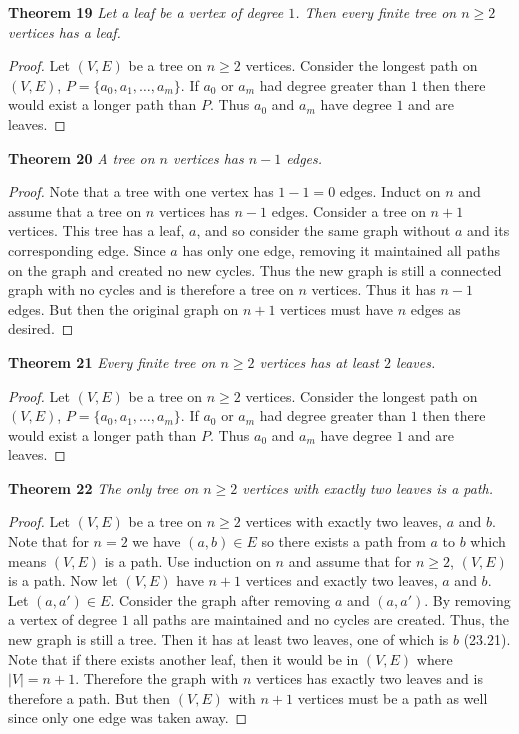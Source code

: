 \documentclass{article}
\begin{document}
\begin{flushleft}
\textbf{Theorem 19}
\textsl{Let a leaf be a vertex of degree $1$. Then every finite tree on $n \geq 2$ vertices has a leaf.}
\begin{proof}
Let $(V,E)$ be a tree on $n \geq 2$ vertices. Consider the longest path on $(V,E)$, $P = \{a_0, a_1, \dots , a_m\}$. If $a_0$ or $a_m$ had degree greater than $1$ then there would exist a longer path than $P$. Thus $a_0$ and $a_m$ have degree $1$ and are leaves.
\end{proof}

\textbf{Theorem 20}
\textsl{A tree on $n$ vertices has $n-1$ edges.}
\begin{proof}
Note that a tree with one vertex has $1-1 = 0$ edges. Induct on $n$ and assume that a tree on $n$ vertices has $n-1$ edges. Consider a tree on $n+1$ vertices. This tree has a leaf, $a$, and so consider the same graph without $a$ and its corresponding edge. Since $a$ has only one edge, removing it maintained all paths on the graph and created no new cycles. Thus the new graph is still a connected graph with no cycles and is therefore a tree on $n$ vertices. Thus it has $n-1$ edges. But then the original graph on $n+1$ vertices must have $n$ edges as desired.
\end{proof}

\textbf{Theorem 21}
\textsl{Every finite tree on $n \geq 2$ vertices has at least $2$ leaves.}
\begin{proof}
Let $(V,E)$ be a tree on $n \geq 2$ vertices. Consider the longest path on $(V,E)$, $P = \{a_0, a_1, \dots , a_m\}$. If $a_0$ or $a_m$ had degree greater than $1$ then there would exist a longer path than $P$. Thus $a_0$ and $a_m$ have degree $1$ and are leaves.
\end{proof}

\textbf{Theorem 22}
\textsl{The only tree on $n \geq 2$ vertices with exactly two leaves is a path.}
\begin{proof}
Let $(V,E)$ be a tree on $n \geq 2$ vertices with exactly two leaves, $a$ and $b$. Note that for $n = 2$ we have $(a,b) \in E$ so there exists a path from $a$ to $b$ which means $(V,E)$ is a path. Use induction on $n$ and assume that for $n \geq 2$, $(V,E)$ is a path. Now let $(V,E)$ have $n+1$ vertices and exactly two leaves, $a$ and $b$. Let $(a,a') \in E$. Consider the graph after removing $a$ and $(a,a')$. By removing a vertex of degree $1$ all paths are maintained and no cycles are created. Thus, the new graph is still a tree. Then it has at least two leaves, one of which is $b$ (23.21). Note that if there exists another leaf, then it would be in $(V,E)$ where $|V| = n+1$. Therefore the graph with $n$ vertices has exactly two leaves and is therefore a path. But then $(V,E)$ with $n+1$ vertices must be a path as well since only one edge was taken away.
\end{proof}


\end{flushleft}
\end{document}
